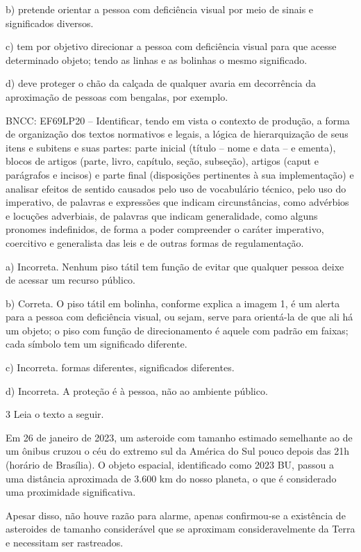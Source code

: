 {b) pretende orientar a pessoa com deficiência visual por meio de sinais
e significados diversos.

c) tem por objetivo direcionar a pessoa com deficiência visual para que
acesse determinado objeto; tendo as linhas e as bolinhas o mesmo
significado.

d) deve proteger o chão da calçada de qualquer avaria em decorrência da
aproximação de pessoas com bengalas, por exemplo.

BNCC: EF69LP20 -- Identificar, tendo em vista o contexto de produção, a
forma de organização dos textos normativos e legais, a lógica de
hierarquização de seus itens e subitens e suas partes: parte inicial
(título -- nome e data -- e ementa), blocos de artigos (parte, livro,
capítulo, seção, subseção), artigos (caput e parágrafos e incisos) e
parte final (disposições pertinentes à sua implementação) e analisar
efeitos de sentido causados pelo uso de vocabulário técnico, pelo uso do
imperativo, de palavras e expressões que indicam circunstâncias, como
advérbios e locuções adverbiais, de palavras que indicam generalidade,
como alguns pronomes indefinidos, de forma a poder compreender o caráter
imperativo, coercitivo e generalista das leis e de outras formas de
regulamentação.

a) Incorreta. Nenhum piso tátil tem função de evitar que qualquer pessoa
deixe de acessar um recurso público.

b) Correta. O piso tátil em bolinha, conforme explica a imagem 1, é um
alerta para a pessoa com deficiência visual, ou sejam, serve para
orientá-la de que ali há um objeto; o piso com função de direcionamento
é aquele com padrão em faixas; cada símbolo tem um significado
diferente.

c) Incorreta. formas diferentes, significados diferentes.

d) Incorreta. A proteção é à pessoa, não ao ambiente público.

\num{3} Leia o texto a seguir.

Em 26 de janeiro de 2023, um asteroide com tamanho estimado semelhante
ao de um ônibus cruzou o céu do extremo sul da América do Sul pouco
depois das 21h (horário de Brasília). O objeto espacial, identificado
como 2023 BU, passou a uma distância aproximada de 3.600 km do nosso
planeta, o que é considerado uma proximidade significativa.

Apesar disso, não houve razão para alarme, apenas confirmou-se a
existência de asteroides de tamanho considerável que se aproximam
consideravelmente da Terra e necessitam ser rastreados.

}
